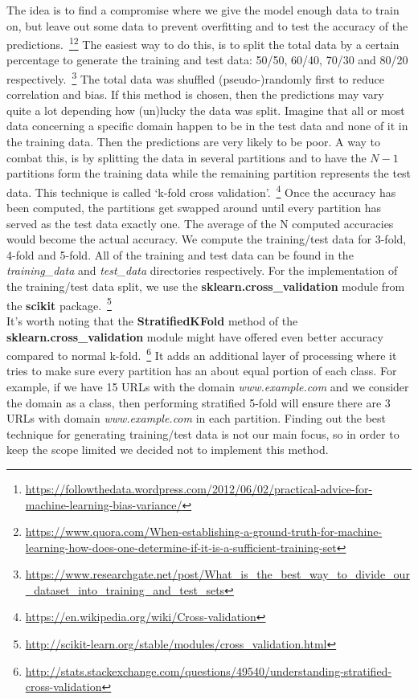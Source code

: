 The idea is to find a compromise where we give the model enough data to train on, but leave out some data to prevent overfitting and to test the accuracy of the predictions.~\footnote{\url{https://followthedata.wordpress.com/2012/06/02/practical-advice-for-machine-learning-bias-variance/}}\footnote{\url{https://www.quora.com/When-establishing-a-ground-truth-for-machine-learning-how-does-one-determine-if-it-is-a-sufficient-training-set}} The easiest way to do this, is to split the total data by a certain percentage to generate the training and test data: 50/50, 60/40, 70/30 and 80/20 respectively.~\footnote{\url{https://www.researchgate.net/post/What_is_the_best_way_to_divide_our_dataset_into_training_and_test_sets}} The total data was shuffled (pseudo-)randomly first to reduce correlation and bias. If this method is chosen, then the predictions may vary quite a lot depending how (un)lucky the data was split. Imagine that all or most data concerning a specific domain happen to be in the test data and none of it in the training data. Then the predictions are very likely to be poor. A way to combat this, is by splitting the data in several partitions and to have the $N-1$ partitions form the training data while the remaining partition represents the test data. This technique is called `k-fold cross validation'.~\footnote{\url{https://en.wikipedia.org/wiki/Cross-validation}} Once the accuracy has been computed, the partitions get swapped around until every partition has served as the test data exactly one. The average of the N computed accuracies would become the actual accuracy. We compute the training/test data for 3-fold, 4-fold and 5-fold. All of the training and test data can be found in the \textit{training\_data} and \textit{test\_data} directories respectively. For the implementation of the training/test data split, we use the \textbf{sklearn.cross\_validation} module from the \textbf{scikit} package.~\footnote{\url{http://scikit-learn.org/stable/modules/cross_validation.html}}
\\[2ex]
It's worth noting that the \textbf{StratifiedKFold} method of the \textbf{sklearn.cross\_validation} module might have offered even better accuracy compared to normal k-fold.~\footnote{\url{http://stats.stackexchange.com/questions/49540/understanding-stratified-cross-validation}} It adds an additional layer of processing where it tries to make sure every partition has an about equal portion of each class. For example, if we have 15 URLs with the domain \textit{www.example.com} and we consider the domain as a class, then performing stratified 5-fold will ensure there are 3 URLs with domain \textit{www.example.com} in each partition. Finding out the best technique for generating training/test data is not our main focus, so in order to keep the scope limited we decided not to implement this method.